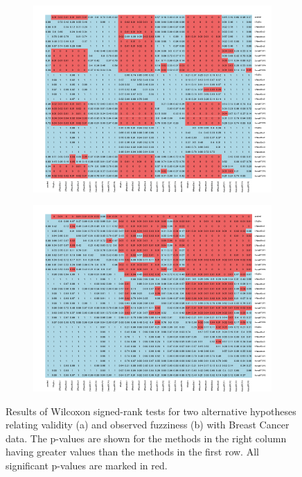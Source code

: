 \documentclass[main]{subfiles}
\begin{document}
 \begin{figure}[h]
\centering
\begin{subfigure}{.5\textwidth}
  \centering
  \includegraphics[width=\linewidth]{images/heatmapBC}
\end{subfigure}%
\begin{subfigure}{.5\textwidth}
  \centering
  \includegraphics[width=\linewidth]{images/heatmapBC_eff}
\end{subfigure}%
\caption{\small Results of Wilcoxon signed-rank tests for two alternative hypotheses relating validity (a) and observed fuzziness (b) with Breast Cancer data. The p-values are shown for the methods in the right column having greater values than the methods in the first row. All significant p-values are marked in red. } \label{fig:testBC}
\end{figure}
\end{document}
